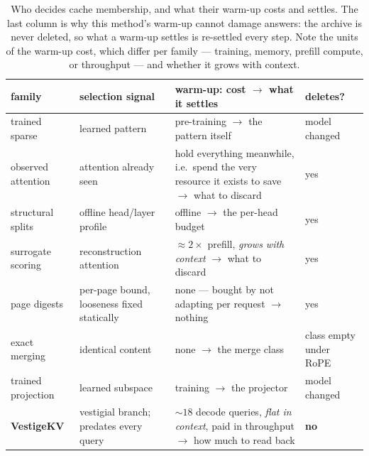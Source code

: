 \begin{table}[H]
\centering\small
\caption{Who decides cache membership, and what their warm-up costs and
settles. The last column is why this method's warm-up cannot damage answers:
the archive is never deleted, so what a warm-up settles is re-settled every
step. Note the units of the warm-up cost, which differ per family --- training,
memory, prefill compute, or throughput --- and whether it grows with context.}
\label{tab:related}
\begin{tabular}{l>{\raggedright\arraybackslash}p{2.9cm}>{\raggedright\arraybackslash}p{4.6cm}l}
\toprule
family & selection signal & warm-up: cost $\to$ what it settles & deletes?\\
\midrule
trained sparse \citep{yuan-etal-2025-native,lu2025moba} & learned pattern &
 pre-training $\to$ the pattern itself & model changed\\
observed attention \citep{zhang2023h2oheavyhitteroracleefficient,NEURIPS2024_28ab4182,oren2024transformersmultistaternns,ICLR2024_5e5fd18f} &
 attention already seen & hold everything meanwhile, i.e.\ spend the very
 resource it exists to save $\to$ what to discard & yes\\
structural splits \citep{xiao2025duoattention,cai2024pyramidkv} &
 offline head/layer profile & offline $\to$ the per-head budget & yes\\
surrogate scoring \citep{kim2025kvzip} & reconstruction attention &
 ${\approx}2\times$ prefill, \emph{grows with context} $\to$ what to discard & yes\\
page digests \citep{tang2024questqueryawaresparsityefficient,chen2024arkvale} &
 per-page bound, looseness fixed statically & none --- bought by not adapting
 per request $\to$ nothing & yes\\
exact merging \citep{tian2025keepkvachievingperiodiclossless} & identical content &
 none $\to$ the merge class & class empty under RoPE\\
trained projection \citep{lin2025matryoshkakvadaptivekvcompression,gelberg2026trainingtransformerskvcache} &
 learned subspace & training $\to$ the projector & model changed\\
\textbf{VestigeKV} & vestigial branch; predates every query &
 ${\sim}18$ decode queries, \emph{flat in context}, paid in throughput $\to$
 how much to read back & \textbf{no}\\
\bottomrule
\end{tabular}
\end{table}

